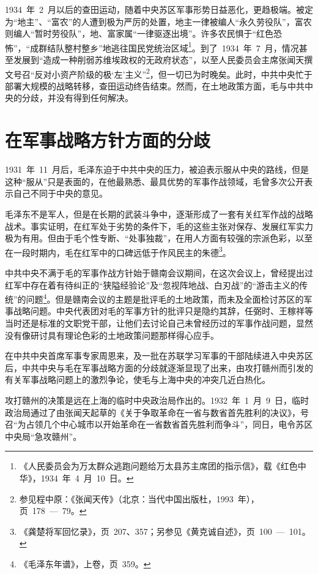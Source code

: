 1934~年~2~月以后的查田运动，随着中央苏区军事形势日益恶化，更趋极端。被定为“地主”、“富农”的人遭到极为严厉的处置，地主一律被编人“永久劳役队”，富农则编人“暂时劳役队”，地、富家属“一律驱逐出境”。许多农民惧于“红色恐怖”，“成群结队整村整乡”地逃往国民党统治区域\footnote{《人民委员会为万太群众逃跑问题给万太县苏主席团的指示信》，载《红色中华》，1934~年~4~月~10~日。}。到了~1934~年~7~月，情况甚至发展到“造成一种削弱苏维埃政权的无政府状态”，以至人民委员会主席张闻天撰文号召“反对小资产阶级的极‘左’主义”\footnote{参见程中原：《张闻天传》（北京：当代中国出版杜，1993~年），页~178~—~79。}，但一切已为时晚矣。此时，中共中央忙于部署大规模的战略转移，查田运动终告结束。然而，在土地政策方面，毛与中共中央的分歧，并没有得到任何解决。

\section{在军事战略方针方面的分歧}

1931~年~11~月后，毛泽东迫于中共中央的压力，被迫表示服从中央的路线，但是这种“服从”只是表面的，在他最熟悉、最具优势的军事作战领域，毛曾多次公开表示自己不同于中央的意见。

毛泽东不是军人，但是在长期的武装斗争中，逐渐形成了一套有关红军作战的战略战术。事实证明，在红军处于劣势的条件下，毛的这些主张对保存、发展红军实力极为有用。但由于毛个性专断、“处事独裁”，在用人方面有较强的宗派色彩，以至在一段时期内，毛在红军中的口碑远低于作风民主的朱德\footnote{《龚楚将军回忆录》，页~207、357；另参见《黄克诚自述》，页~100~—~101。}。

中共中央不满于毛的军事作战方针始于赣南会议期间，在这次会议上，曾经提出过红军中存在着有待纠正的“狭隘经验论”及“忽视阵地战、白刃战”的“游击主义的传统”的问题\footnote{《毛泽东年谱》，上卷，页~359。}。但是赣南会议的主题是批评毛的土地政策，而未及全面检讨苏区的军事战略问题。中央代表团对毛的军事方针的批评只是隐约其辞，任弼时、王稼祥等当时还是标准的文职党干部，让他们去讨论自己未曾经历过的军事作战问题，显然没有像研讨具有理论色彩的土地政策问题那样得心应手。

在中共中央首席军事专家周恩来，及一批在苏联学习军事的干部陆续进入中央苏区后，中共中央与毛在军事战略方面的分歧就逐渐显现了出来，由攻打赣州而引发的有关军事战略问题上的激烈争论，使毛与上海中央的冲突几近白热化。

攻打赣州的决策是远在上海的临时中央政治局作出的。1932~年~1~月~9~日，临时政治局通过了由张闻天起草的《关于争取革命在一省与数省首先胜利的决议》，号召“为占领几个中心城市以开始革命在一省数省首先胜利而争斗”，同日，电令苏区中央局“急攻赣州”。

